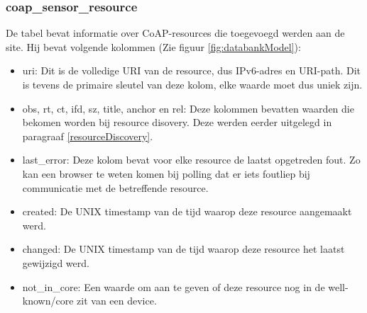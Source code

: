 \subsubsection{coap\_sensor\_resource}
De tabel bevat informatie over CoAP-resources die toegevoegd werden aan de site. Hij bevat volgende kolommen (Zie figuur \ref{fig:databankModel}):
\begin{itemize}
\item uri: Dit is de volledige URI van de resource, dus IPv6-adres en URI-path. Dit is tevens de primaire sleutel van deze kolom, elke waarde moet dus uniek zijn.
\item obs, rt, ct, ifd, sz, title, anchor en rel: Deze kolommen bevatten waarden die bekomen worden bij resource disovery. Deze werden eerder uitgelegd in paragraaf \ref{resourceDiscovery}.
\item last\_error: Deze kolom bevat voor elke resource de laatst opgetreden fout. Zo kan een browser te weten komen bij polling dat er iets foutliep bij communicatie met de betreffende resource.
\item created: De UNIX timestamp van de tijd waarop deze resource aangemaakt werd.
\item changed: De UNIX timestamp van de tijd waarop deze resource het laatst gewijzigd werd.
\item not\_in\_core: Een waarde om aan te geven of deze resource nog in de well-known/core zit van een device.
\end{itemize}
